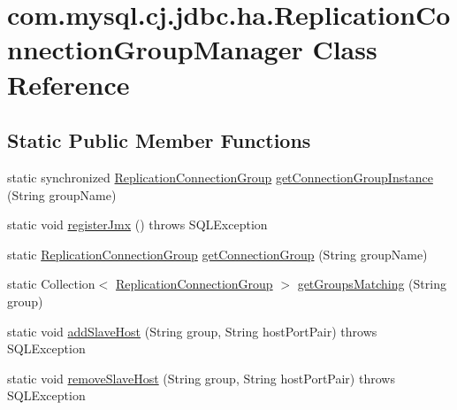 \hypertarget{classcom_1_1mysql_1_1cj_1_1jdbc_1_1ha_1_1_replication_connection_group_manager}{}\section{com.\+mysql.\+cj.\+jdbc.\+ha.\+Replication\+Connection\+Group\+Manager Class Reference}
\label{classcom_1_1mysql_1_1cj_1_1jdbc_1_1ha_1_1_replication_connection_group_manager}
\subsection*{Static Public Member Functions}
\begin{DoxyCompactItemize}
\item 
static synchronized \mbox{\hyperlink{classcom_1_1mysql_1_1cj_1_1jdbc_1_1ha_1_1_replication_connection_group}{Replication\+Connection\+Group}} \mbox{\hyperlink{classcom_1_1mysql_1_1cj_1_1jdbc_1_1ha_1_1_replication_connection_group_manager_a6b5ee75a1dcfcd04eb2ceb2d9a0a6cd6}{get\+Connection\+Group\+Instance}} (String group\+Name)
\item 
static void \mbox{\hyperlink{classcom_1_1mysql_1_1cj_1_1jdbc_1_1ha_1_1_replication_connection_group_manager_a1c2aea26a718086e4dc12f4219a3c322}{register\+Jmx}} ()  throws S\+Q\+L\+Exception 
\item 
static \mbox{\hyperlink{classcom_1_1mysql_1_1cj_1_1jdbc_1_1ha_1_1_replication_connection_group}{Replication\+Connection\+Group}} \mbox{\hyperlink{classcom_1_1mysql_1_1cj_1_1jdbc_1_1ha_1_1_replication_connection_group_manager_aeb41d1eb720977c09e22ce61921d59f0}{get\+Connection\+Group}} (String group\+Name)
\item 
static Collection$<$ \mbox{\hyperlink{classcom_1_1mysql_1_1cj_1_1jdbc_1_1ha_1_1_replication_connection_group}{Replication\+Connection\+Group}} $>$ \mbox{\hyperlink{classcom_1_1mysql_1_1cj_1_1jdbc_1_1ha_1_1_replication_connection_group_manager_a1ce7d74bfbe1f131117844b86b7451b0}{get\+Groups\+Matching}} (String group)
\item 
static void \mbox{\hyperlink{classcom_1_1mysql_1_1cj_1_1jdbc_1_1ha_1_1_replication_connection_group_manager_a029338b7bd08d389407cea45a0a57a7a}{add\+Slave\+Host}} (String group, String host\+Port\+Pair)  throws S\+Q\+L\+Exception 
\item 
static void \mbox{\hyperlink{classcom_1_1mysql_1_1cj_1_1jdbc_1_1ha_1_1_replication_connection_group_manager_a32c7e6e4baec6ca377d9831577a8c515}{remove\+Slave\+Host}} (String group, String host\+Port\+Pair)  throws S\+Q\+L\+Exception 

\end{DoxyCompactItemize}
